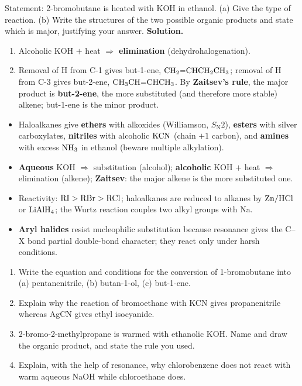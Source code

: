\documentclass[11pt]{article}
\begin{document}
\begin{exoresolu}
Statement: 2-bromobutane is heated with KOH in ethanol. (a) Give the type of reaction. (b) Write the structures of the two possible organic products and state which is major, justifying your answer.
\tcblower
\textbf{Solution.}
\begin{enumerate}
\item[(a)] Alcoholic KOH $+$ heat $\Rightarrow$ \textbf{elimination} (dehydrohalogenation).
\item[(b)] Removal of H from C-1 gives but-1-ene, $\ce{CH2=CHCH2CH3}$; removal of H from C-3 gives but-2-ene, $\ce{CH3CH=CHCH3}$. By \textbf{Zaitsev's rule}, the major product is \textbf{but-2-ene}, the more substituted (and therefore more stable) alkene; but-1-ene is the minor product.
\end{enumerate}
\end{exoresolu}

\begin{aretenir}
\begin{itemize}
\item Haloalkanes give \textbf{ethers} with alkoxides (Williamson, $S_{\mathrm{N}}2$), \textbf{esters} with silver carboxylates, \textbf{nitriles} with alcoholic $\ce{KCN}$ (chain $+1$ carbon), and \textbf{amines} with excess $\ce{NH3}$ in ethanol (beware multiple alkylation).
\item \textbf{Aqueous} KOH $\Rightarrow$ substitution (alcohol); \textbf{alcoholic} KOH $+$ heat $\Rightarrow$ elimination (alkene); \textbf{Zaitsev}: the major alkene is the more substituted one.
\item Reactivity: $\ce{RI} > \ce{RBr} > \ce{RCl}$; haloalkanes are reduced to alkanes by $\ce{Zn/HCl}$ or $\ce{LiAlH4}$; the Wurtz reaction couples two alkyl groups with Na.
\item \textbf{Aryl halides} resist nucleophilic substitution because resonance gives the C--X bond partial double-bond character; they react only under harsh conditions.
\end{itemize}
\end{aretenir}

\begin{exercice}[Practice]
\begin{enumerate}
\item Write the equation and conditions for the conversion of 1-bromobutane into (a) pentanenitrile, (b) butan-1-ol, (c) but-1-ene.
\item Explain why the reaction of bromoethane with KCN gives propanenitrile whereas AgCN gives ethyl isocyanide.
\item 2-bromo-2-methylpropane is warmed with ethanolic KOH. Name and draw the organic product, and state the rule you used.
\item Explain, with the help of resonance, why chlorobenzene does not react with warm aqueous NaOH while chloroethane does.
\end{enumerate}
\end{exercice}
\end{document}
